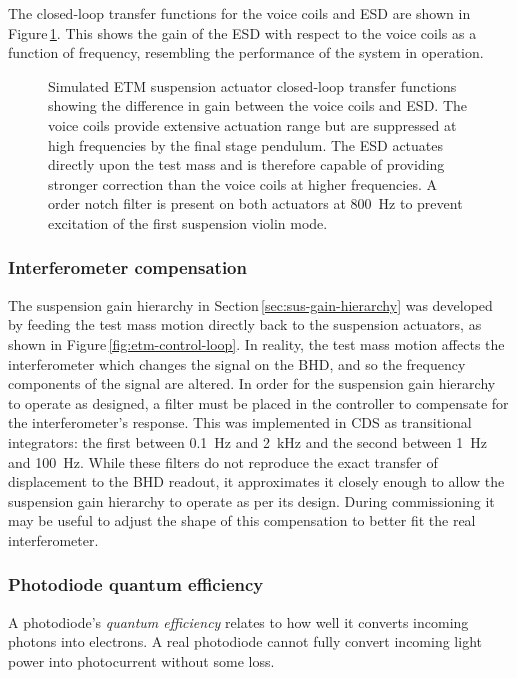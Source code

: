 The closed-loop transfer functions for the voice coils and \gls{ESD} are shown in Figure\,\ref{fig:suspension-crossover}. This shows the gain of the \gls{ESD} with respect to the voice coils as a function of frequency, resembling the performance of the system in operation.

\begin{figure}
  
  \caption[Simulated end test mass suspension actuator closed loop transfer functions]{\label{fig:suspension-crossover}Simulated \SSMEXPT{} ETM suspension actuator closed-loop transfer functions showing the difference in gain between the voice coils and \gls{ESD}. The voice coils provide extensive actuation range but are suppressed at high frequencies by the final stage pendulum. The \gls{ESD} actuates directly upon the test mass and is therefore capable of providing stronger correction than the voice coils at higher frequencies. A  order notch filter is present on both actuators at \SI{800}{\hertz} to prevent excitation of the first suspension violin mode.}
\end{figure}

\subsubsection{\label{sec:ifo-compensation}Interferometer compensation}
The suspension gain hierarchy in Section\,\ref{sec:sus-gain-hierarchy} was developed by feeding the test mass motion directly back to the suspension actuators, as shown in Figure\,\ref{fig:etm-control-loop}. In reality, the test mass motion affects the interferometer which changes the signal on the \gls{BHD}, and so the frequency components of the signal are altered. In order for the suspension gain hierarchy to operate as designed, a filter must be placed in the controller to compensate for the interferometer's response. This was implemented in \gls{CDS} as transitional integrators: the first between \SI{0.1}{\hertz} and \SI{2}{\kilo\hertz} and the second between \SI{1}{\hertz} and \SI{100}{\hertz}. While these filters do not reproduce the exact transfer of \LMINUS{} displacement to the \gls{BHD} readout, it approximates it closely enough to allow the suspension gain hierarchy to operate as per its design. During commissioning it may be useful to adjust the shape of this compensation to better fit the real interferometer.

\subsubsection{Photodiode quantum efficiency}
A photodiode's \emph{quantum efficiency} relates to how well it converts incoming photons into electrons. A real photodiode cannot fully convert incoming light power into photocurrent without some loss.

